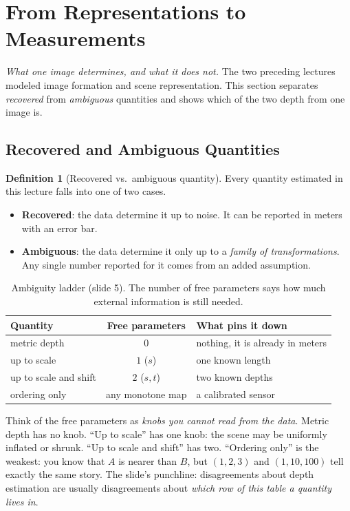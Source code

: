 \documentclass[11pt,a4paper]{article}
\theoremstyle{definition}
\newtheorem{definition}{Definition}[section]
\theoremstyle{plain}
\theoremstyle{remark}
\begin{document}
\section{From Representations to Measurements }
\emph{What one image determines, and what it does not.} The two preceding lectures modeled image formation and scene representation. This section separates \emph{recovered} from \emph{ambiguous} quantities and shows which of the two depth from one image is.
 
\subsection{Recovered and Ambiguous Quantities }
 
\begin{definition}[Recovered vs.\ ambiguous quantity]
Every quantity estimated in this lecture falls into one of two cases.
\begin{itemize}
\item \textbf{Recovered}: the data determine it up to noise. It can be reported in meters with an error bar.
\item \textbf{Ambiguous}: the data determine it only up to a \emph{family of transformations}. Any single number reported for it comes from an added assumption.
\end{itemize}
\end{definition}
 
\begin{table}[htbp]
\centering\small
\begin{tabular}{lcp{5.6cm}}
\toprule
Quantity & Free parameters & What pins it down\\
\midrule
metric depth & $0$ & nothing, it is already in meters\\
up to scale & $1$ ($s$) & one known length\\
up to scale and shift & $2$ ($s,t$) & two known depths\\
ordering only & any monotone map & a calibrated sensor\\
\bottomrule
\end{tabular}
\caption{Ambiguity ladder (slide 5). The number of free parameters says how much external information is still needed.}
\end{table}
 
\begin{intuition}
Think of the free parameters as \emph{knobs you cannot read from the data}. Metric depth has no knob. ``Up to scale'' has one knob: the scene may be uniformly inflated or shrunk. ``Up to scale and shift'' has two. ``Ordering only'' is the weakest: you know that $A$ is nearer than $B$, but $(1,2,3)$ and $(1,10,100)$ tell exactly the same story. The slide's punchline: disagreements about depth estimation are usually disagreements about \emph{which row of this table a quantity lives in}.
\end{intuition}
 
\end{document}
